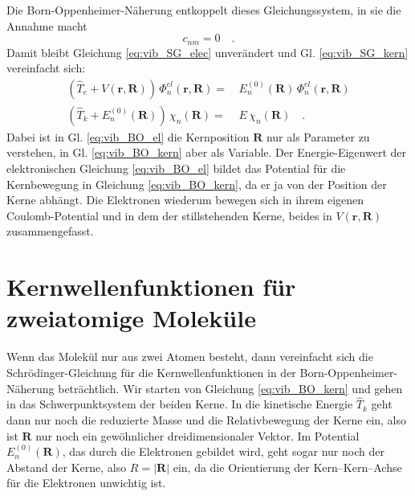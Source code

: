 Die Born-Oppenheimer-Näherung entkoppelt dieses Gleichungssystem, in sie die Annahme macht
\begin{equation}
c_{n m } = 0 \quad .
\end{equation}
Damit bleibt Gleichung \ref{eq:vib_SG_elec} unverändert und Gl. \ref{eq:vib_SG_kern} vereinfacht sich:
\begin{align}
\left( \hat{T}_e + V (\mathbf{r}, \mathbf{R}) \right) \, \Phi_n^{el}  (\mathbf{r}, \mathbf{R})  = &  \, E_n^{(0)}  (\mathbf{R})  \, \Phi_n^{el}  (\mathbf{r}, \mathbf{R})    \label{eq:vib_BO_el}\\
\left( \hat{T}_k + E_n^{(0)}(\mathbf{R})  \right) \, \chi_n (\mathbf{R}) =  &   \, E  \, \chi_n (\mathbf{R})  \quad .  \label{eq:vib_BO_kern}
\end{align}
Dabei ist in Gl. \ref{eq:vib_BO_el} die Kernposition $\mathbf{R}$ nur als Parameter zu verstehen, in Gl. \ref{eq:vib_BO_kern} aber als Variable. Der Energie-Eigenwert der elektronischen Gleichung \ref{eq:vib_BO_el}  bildet das Potential für die Kernbewegung in Gleichung  \ref{eq:vib_BO_kern}, da er ja von der Position der Kerne abhängt. Die Elektronen wiederum bewegen sich in ihrem eigenen Coulomb-Potential und in dem der stillstehenden Kerne, beides in 
$V (\mathbf{r}, \mathbf{R}) $ zusammengefasst.


\section{Kernwellenfunktionen für zweiatomige Moleküle}

Wenn das Molekül nur aus zwei Atomen besteht, dann vereinfacht sich die Schrödinger-Gleichung für die Kernwellenfunktionen in der Born-Oppenheimer-Näherung beträchtlich. Wir starten von Gleichung \ref{eq:vib_BO_kern} und gehen in das Schwerpunktsystem der beiden Kerne. In die kinetische Energie $\hat{T}_k$ geht dann nur noch die reduzierte Masse und die Relativbewegung der Kerne ein, also ist $\mathbf{R}$ nur noch ein gewöhnlicher dreidimensionaler Vektor. Im Potential $ E_n^{(0)}(\mathbf{R})  $, das durch die Elektronen gebildet wird, geht sogar nur noch der Abstand der Kerne, also $R = |\mathbf{R}| $ ein, da die Orientierung der Kern--Kern--Achse für die Elektronen unwichtig ist. 

